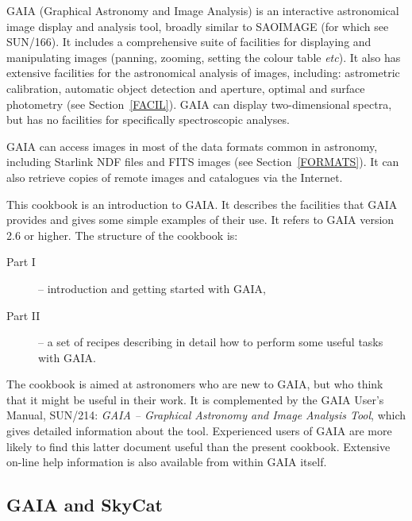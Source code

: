 \documentclass[twoside,11pt]{article}
\newcommand{\xref}[3]{#1}
\begin{document}
GAIA (Graphical Astronomy and Image Analysis) is an interactive
astronomical image display and analysis tool, broadly similar to SAOIMAGE
(for which see \xref{SUN/166}{sun166}{}\cite{SUN166}).  It includes a
comprehensive suite of facilities for displaying and manipulating images
(panning, zooming, setting the colour table \emph{etc}\/).  It also has
extensive facilities for the astronomical analysis of images, including:
astrometric calibration, automatic object detection and aperture, optimal
and surface photometry (see Section~\ref{FACIL}).  GAIA can display
two-dimensional spectra, but has no facilities for specifically
spectroscopic analyses.

GAIA can access images in most of the data formats common in astronomy,
including Starlink NDF files and FITS images (see Section~\ref{FORMATS}).
It can also retrieve copies of remote images and catalogues via the
Internet.

This cookbook is an introduction to GAIA.  It describes the facilities
that GAIA provides and gives some simple examples of their use.  It
refers to GAIA version 2.6 or higher.  The structure of the cookbook is:

\begin{description}

  \item[{\rm Part I}] -- introduction and getting started with GAIA,

  \item[{\rm Part II}] -- a set of recipes describing in detail how to
   perform some useful tasks with GAIA.

\end{description}

The cookbook is aimed at astronomers who are new to GAIA, but who think
that it might be useful in their work.  It is complemented by the GAIA
User's Manual, \xref{SUN/214: {\it GAIA -- Graphical Astronomy and Image
Analysis Tool}}{sun214}{}\/\cite{SUN214}, which gives detailed information
about the tool.  Experienced users of GAIA are more likely to find this
latter document useful than the present cookbook.  Extensive on-line
help information is also available from within GAIA itself.

\subsection{GAIA and SkyCat}
\end{document}
